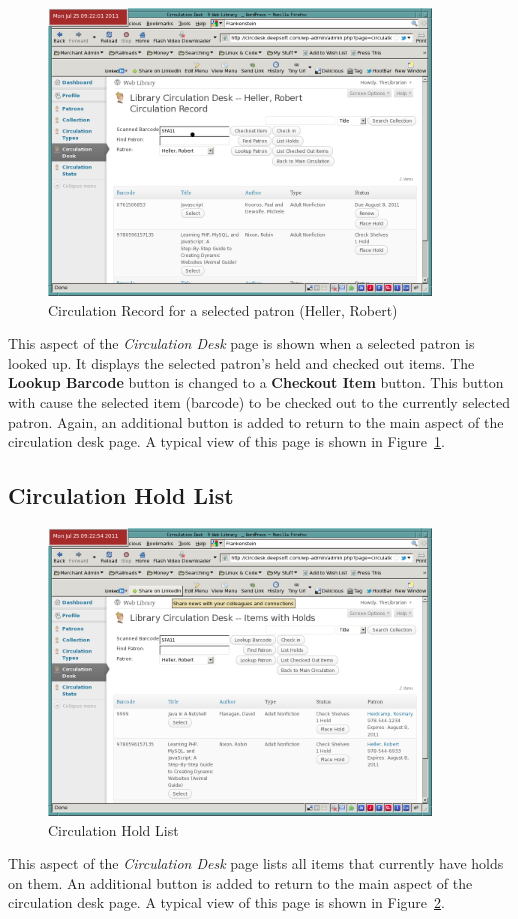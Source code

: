 \documentclass[letterpaper,twoside]{article}
\begin{document}
\begin{figure}[htbp]
\begin{centering}
\includegraphics[width=4in]{PatronCirculationRecord.png}
\caption{Circulation Record for a selected patron (Heller, Robert)}
\label{fig:PatronCirculationRecord}
\end{centering}
\end{figure}
This aspect of the \textit{Circulation Desk} page is shown when a
selected patron is looked up.  It displays the selected patron's held
and checked out items.  The \textbf{Lookup Barcode} button is changed to
a \textbf{Checkout Item} button.  This button with cause the selected
item (barcode) to be checked out to the currently selected patron. 
Again, an additional button is added to return to the main
aspect of the circulation desk page.  A typical view of this page is
shown in Figure~\ref{fig:PatronCirculationRecord}.

\subsection{Circulation Hold List}
\label{sect:CirculationHoldList}

\begin{figure}[htbp]
\begin{centering}
\includegraphics[width=4in]{CirculationHoldList.png}
\caption{Circulation Hold List}
\label{fig:CirculationHoldList}
\end{centering}
\end{figure}
This aspect of the \textit{Circulation Desk} page lists all items that
currently have holds on them. An additional button is added to return to
the main aspect of the circulation desk page.  A typical view of this
page is shown in Figure~\ref{fig:CirculationHoldList}.
\end{document}
